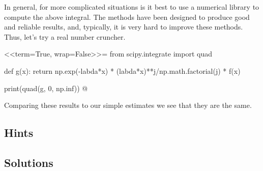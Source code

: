 \begin{question}
\begin{solution}
In general, for more complicated situations is it best to use a
numerical library to compute the above integral. The methods have been
designed to produce good and reliable results, and, typically, it is
very hard to improve these methods. Thus, let's try a real number
cruncher.

<<term=True, wrap=False>>=
from scipy.integrate import quad

def g(x):
    return np.exp(-labda*x) * (labda*x)**j/np.math.factorial(j) * f(x)

print(quad(g, 0, np.inf))
@

Comparing these results to our simple estimates we see that they are
the same.
\end{solution}
\end{question}


\begin{comment}
  
\begin{question}[use=false]
  To analyze the distribution of $L$ of the $M/G/1$ we concentrated on
  the departure epochs. Why will this not help to find the
  distribution of $L$ for the $M/G/c$ queue?
  \begin{solution}
    \TBD.
  \end{solution}
\end{question}
\end{comment}


\subsection*{Hints}

\subsection*{Solutions}





